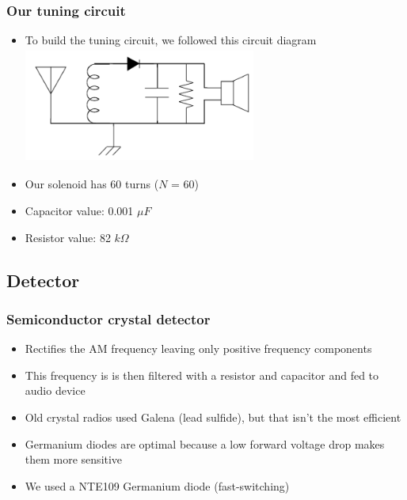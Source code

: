 \documentclass[11pt]{beamer}
\theoremstyle{definition}
\begin{document}
                \begin{frame}
                  \frametitle{Our tuning circuit}
                  \begin{itemize}
                        \item To build the tuning circuit, we followed this circuit diagram
                        \includegraphics[height=1.5in, width=3in]{Figures/circuitDiagram}
                        \item Our solenoid has 60 turns ($N$ = 60)
                        \item Capacitor value: 0.001 $\mu F$
                        \item Resistor value: 82 $k\Omega$
                  \end{itemize}
                \end{frame}

            \subsection{Detector}
                  \begin{frame}
                  \frametitle{Semiconductor crystal detector}
                  \begin{itemize}[<+->]
                        \item Rectifies the AM frequency leaving only positive frequency components
                        \vspace{2mm}
                        \item This frequency is is then filtered with a resistor and capacitor and fed to audio device
                        \vspace{2mm}
                        \item Old crystal radios used Galena (lead sulfide), but that isn't the most efficient
                        \vspace{2mm}
                        \item Germanium diodes are optimal because a low forward voltage drop makes them more sensitive
                        \vspace{2mm}
                        \item We used a NTE109 Germanium diode (fast-switching)
                  \end{itemize}
            \end{frame}
\end{document}
